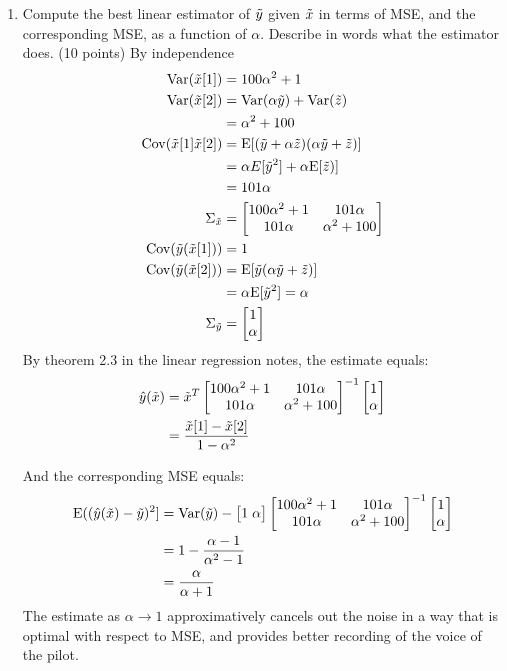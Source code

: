 \documentclass[11pt,twoside]{article}
\begin{document}
\begin{exam}
\begin{exercise}
\begin{problem}
\begin{enumerate}
\item Compute the best linear estimator of $\tilde{  y }$ given $\tilde{  x }$ in terms of MSE, and the corresponding MSE, as a function of $\alpha$. Describe in words what the estimator does.  (10 points)
By independence
\begin{align*}
	\var(\rx[1])			&=	100 \alpha^2 + 1 \\
	\var(\rx[2])			&=	\var(\alpha \ry ) + \var(\rnd{z}) \\
					&=	 \alpha^2 + 100 \\
	\Cov({\rx[1]}{\rx[2]})	&=	\E[ (\ry + \alpha \rnd{z}) (\alpha \ry + \rnd{z}) ] \\
					&=	 \alpha E[\ry^2] + \alpha \E[\rnd{z})] \\
					&=	101 \alpha \\
	\Sigma_{\rx}		&= 	\MAT{100 \alpha^2 + 1 & 101 \alpha \\ 101 \alpha &  \alpha^2 + 100 } \\
	\Cov({\ry}{(\rx[1])})	&= 1 \\
	\Cov({\ry}{(\rx[2])})	&=	 \E[ \ry (\alpha \ry + \rnd{z}) ] \\
					&=	\alpha \E[\ry^2] = \alpha \\
	\Sigma_{\ry}		&=	\MAT{1 \\ \alpha}	\\			
\end{align*}
By theorem 2.3 in the linear regression notes, the estimate equals:
\begin{align*}
		\hat{y}(\tilde{  x }) 	&= 	\tilde{  x }^T 	\begin{bmatrix} 100 \alpha^2 + 1 & 101 \alpha \\ 101 \alpha &  \alpha^2 + 100  \end{bmatrix}^{-1}	\begin{bmatrix} 1 \\ \alpha \end{bmatrix} \\
					&= 	\frac{\tilde{  x }[1] - \tilde{  x }[2]} {1 - \alpha^2}
\end{align*}

And the corresponding MSE equals:
\begin{align*}
	\E( (\hat{y}(\rx)  - \ry)^2 ]		&= \var(\ry) - \MAT{1 \; \alpha} \MAT{100 \alpha^2 + 1 & 101 \alpha \\ 101 \alpha &  \alpha^2 + 100 }^{-1}	\MAT{1 \\ \alpha} \\
							&= 1 - \frac{\alpha -1} {\alpha^2-1} \\
							&= \frac{\alpha} {\alpha +1}
\end{align*}
The estimate as $\alpha \rightarrow 1$ approximatively cancels out the noise in a way that is optimal with respect to MSE, and provides better recording of the voice of the pilot.


\end{enumerate}
\end{problem}
\end{exercise}
\end{exam}
\end{document}
